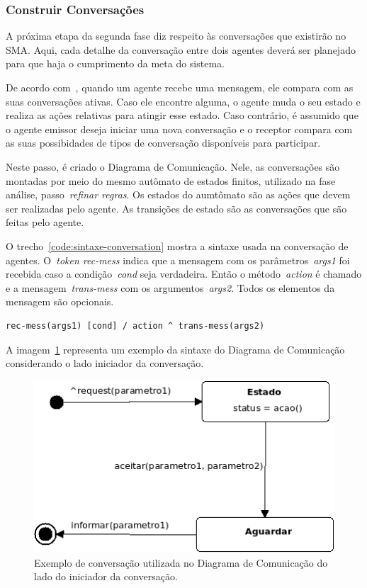 \subsubsection{Construir Conversações}

A próxima etapa da segunda fase diz respeito às conversações que existirão no SMA. Aqui, cada detalhe da conversação entre dois agentes deverá ser planejado para que haja o cumprimento da meta do sistema.

De acordo com~\cite{scott01}, quando um agente recebe uma mensagem, ele compara com as suas conversações ativas. Caso ele encontre alguma, o agente muda o seu estado e realiza as ações relativas para atingir esse estado. Caso contrário, é assumido que o agente emissor deseja iniciar uma nova conversação e o receptor compara com as suas possibidades de tipos de conversação disponíveis para participar.

Neste passo, é criado o Diagrama de Comunicação. Nele, as conversações são montadas por meio do mesmo autômato de estados finitos, utilizado na fase análise, passo~\emph{refinar regras}. Os estados do aumtômato são as ações que devem ser realizadas pelo agente. As transições de estado são as conversações que são feitas pelo agente.

O trecho~\ref{code:sintaxe-conversation} mostra a sintaxe usada na conversação de agentes. O~\emph{token rec-mess} indica que a mensagem com os parâmetros~\emph{args1} foi recebida caso a condição~\emph{cond} seja verdadeira. Então o método~\emph{action} é chamado e a mensagem~\emph{trans-mess} com os argumentos~\emph{args2}. Todos os elementos da mensagem são opcionais.

\begin{lstlisting}[label=code:sintaxe-conversation,caption=Sintaxe da conversação entre dois agentes.]
	rec-mess(args1) [cond] / action ^ trans-mess(args2)
\end{lstlisting}


A imagem~\ref{fig:exemplo-conversation} representa um exemplo da sintaxe do Diagrama de Comunicação considerando o lado iniciador da conversação.

\begin{figure}
	\centering
	\includegraphics[scale=0.65]{images/exemplo-conversation.png}
	\caption{Exemplo de conversação utilizada no Diagrama de Comunicação do lado do iniciador da conversação.}
	\label{fig:exemplo-conversation}
\end{figure}

